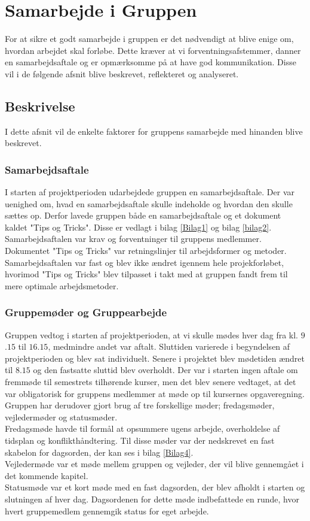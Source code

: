 \chapter{Samarbejde i Gruppen}
For at sikre et godt samarbejde i gruppen er det nødvendigt at blive enige om, hvordan arbejdet skal forløbe. Dette kræver at vi forventningsafstemmer, danner en samarbejdsaftale og er opmærksomme på at have god kommunikation. Disse vil i de følgende afsnit blive beskrevet, reflekteret og analyseret.

\section{Beskrivelse}
I dette afsnit vil de enkelte faktorer for gruppens samarbejde med hinanden blive beskrevet. 

\subsection{Samarbejdsaftale}
I starten af projektperioden udarbejdede gruppen en samarbejdsaftale. Der var uenighed om, hvad en samarbejdsaftale skulle indeholde og hvordan den skulle sættes op. Derfor lavede gruppen både en samarbejdsaftale og et dokument kaldet "Tips og Tricks". Disse er vedlagt i bilag \ref{Bilag1} og bilag \ref{bilag2}. Samarbejdsaftalen var krav og forventninger til gruppens medlemmer. Dokumentet "Tips og Tricks" var retningslinjer til arbejdsformer og metoder. Samarbejdsaftalen var fast og blev ikke ændret igennem hele projekforløbet, hvorimod "Tips og Tricks" blev tilpasset i takt med at gruppen fandt frem til mere optimale arbejdsmetoder. 

\subsection{Gruppemøder og Gruppearbejde}
Gruppen vedtog i starten af projektperioden, at vi skulle mødes hver dag fra kl. $9$.$15$ til $16$.$15$, medmindre andet var aftalt. Sluttiden varierede i begyndelsen af projektperioden og blev sat individuelt. Senere i projektet blev mødetiden ændret til $8.15$ og den fastsatte sluttid blev overholdt. Der var i starten ingen aftale om fremmøde til semestrets tilhørende kurser, men det blev senere vedtaget, at det var obligatorisk for gruppens medlemmer at møde op til kursernes opgaveregning.
Gruppen har derudover gjort brug af tre forskellige møder; fredagsmøder, vejledermøder og statusmøder. \\
Fredagsmøde havde til formål at opsummere ugens arbejde, overholdelse af tidsplan og konflikthåndtering. Til disse møder var der nedskrevet en fast skabelon for dagsorden, der kan ses i bilag \ref{Bilag4}. \\
Vejledermøde var et møde mellem gruppen og vejleder, der vil blive gennemgået i det kommende kapitel. \\
Statusmøde var et kort møde med en fast dagsorden, der blev afholdt i starten og slutningen af hver dag. Dagsordenen for dette møde indbefattede en runde, hvor hvert gruppemedlem gennemgik status for eget arbejde.

